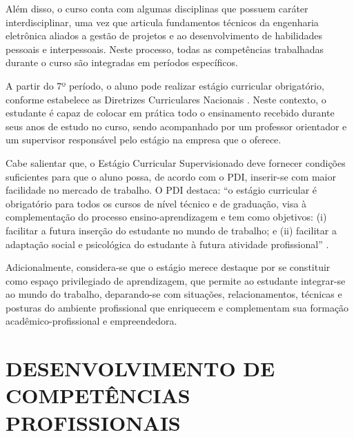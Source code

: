 Além disso, o curso conta com algumas disciplinas que possuem caráter interdisciplinar, uma vez que articula fundamentos técnicos da engenharia eletrônica aliados a gestão de projetos e ao desenvolvimento de habilidades pessoais e interpessoais. Neste processo, todas as competências trabalhadas durante o curso são integradas em períodos específicos. %

A partir do 7º período, o aluno pode realizar estágio curricular obrigatório, conforme estabelece as Diretrizes Curriculares Nacionais \cite{dcneng}. Neste contexto, o estudante é capaz de colocar em prática todo o ensinamento recebido durante seus anos de estudo no curso, sendo acompanhado por um professor orientador e um supervisor responsável pelo estágio na empresa que o oferece.

Cabe salientar que, o Estágio Curricular Supervisionado deve fornecer condições suficientes para que o aluno possa, de acordo com o PDI, inserir-se com maior facilidade no mercado de trabalho. O PDI destaca: “o estágio curricular é obrigatório para todos os cursos de nível técnico e de graduação, visa à complementação do processo ensino-aprendizagem e tem como objetivos: (i) facilitar a futura inserção do estudante no mundo de trabalho; e (ii) facilitar a adaptação social e psicológica do estudante à futura atividade profissional” \cite{pdiutfpr}.

Adicionalmente, considera-se que o estágio merece destaque por se constituir como espaço privilegiado de aprendizagem, que permite ao estudante integrar-se ao mundo do trabalho, deparando-se com situações, relacionamentos, técnicas e posturas do ambiente profissional que enriquecem e complementam sua formação acadêmico-profissional e empreendedora.

\section{DESENVOLVIMENTO DE COMPETÊNCIAS PROFISSIONAIS}
\label{sec:desen}



